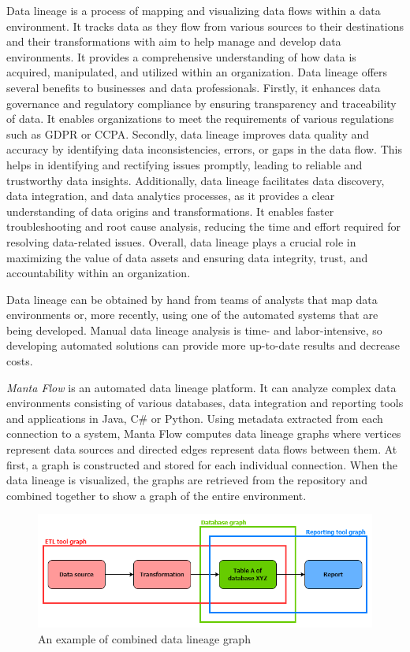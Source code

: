 Data lineage is a process of mapping and visualizing data flows within a data environment. It tracks data as they flow from various sources to their destinations and their transformations with aim to help manage and develop data environments. It provides a comprehensive understanding of how data is acquired, manipulated, and utilized within an organization. Data lineage offers several benefits to businesses and data professionals. Firstly, it enhances data governance and regulatory compliance by ensuring transparency and traceability of data. It enables organizations to meet the requirements of various regulations such as GDPR or CCPA. Secondly, data lineage improves data quality and accuracy by identifying data inconsistencies, errors, or gaps in the data flow. This helps in identifying and rectifying issues promptly, leading to reliable and trustworthy data insights. Additionally, data lineage facilitates data discovery, data integration, and data analytics processes, as it provides a clear understanding of data origins and transformations. It enables faster troubleshooting and root cause analysis, reducing the time and effort required for resolving data-related issues. Overall, data lineage plays a crucial role in maximizing the value of data assets and ensuring data integrity, trust, and accountability within an organization.
\par
Data lineage can be obtained by hand from teams of analysts that map data environments or, more recently, using one of the automated systems that are being developed. Manual data lineage analysis is time- and labor-intensive, so developing automated solutions can provide more up-to-date results and decrease costs.
\par
\textit{Manta Flow} is an automated data lineage platform. It can analyze complex data environments consisting of various databases, data integration and reporting tools and applications in Java, C\# or Python. Using metadata extracted from each connection to a system, Manta Flow computes data lineage graphs where vertices represent data sources and directed edges represent data flows between them. At first, a graph is constructed and stored for each individual connection. When the data lineage is visualized, the graphs are retrieved from the repository and combined together to show a graph of the entire environment.

\begin{figure}[ht]\centering
\includegraphics[width=1.0\textwidth]{img/graph_example.png}
\caption{An example of combined data lineage graph}
\label{figGraphExample}
\end{figure}  

